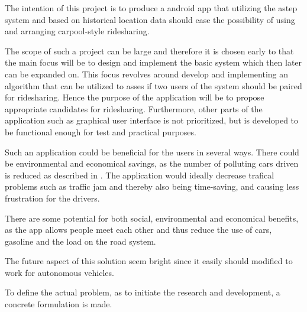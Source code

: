 The intention of this project is to produce a android app that utilizing the \gls{astep} system and based on historical location data should ease the possibility of using and arranging carpool-style ridesharing.

The scope of such a project can be large and therefore it is chosen early to that the main focus will be to design and implement the basic system which then later can be expanded on.
This focus revolves around develop and implementing an algorithm that can be utilized to asses if two users of the system should be paired for ridesharing.
Hence the purpose of the application will be to propose appropriate candidates for ridesharing.
Furthermore, other parts of the application such as graphical user interface is not prioritized, but is developed to be functional enough for test and practical purposes.

Such an application could be beneficial for the users in several ways. There could be environmental and economical savings, as the number of polluting cars driven is reduced as described in \cite{doi:10.1080/01441647.2011.621557}. The application would ideally decrease trafical problems such as traffic jam and thereby also being time-saving, and causing less frustration for the drivers.

There are some potential for both social, environmental and economical benefits, as the app allows people meet each other and thus reduce the use of cars, gasoline and the load on the road system.

The future aspect of this solution seem bright since it easily should modified to work for autonomous vehicles.

To define the actual problem, as to initiate the research and development, a concrete formulation is made.